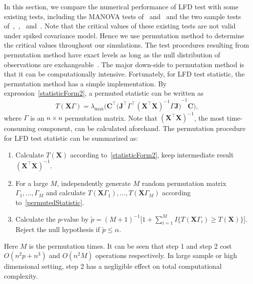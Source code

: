 \documentclass[12pt]{article} %
\newcommand{\bX}{\mathbf{X}}
\newcommand{\bJ}{\mathbf{J}}
\newcommand{\bC}{\mathbf{C}}
\theoremstyle{definition}
\begin{document}
In this section, we compare the numerical performance of LFD test with some existing tests, including the MANOVA tests of~\citet{Schott2007Some} and~\citet{Cai2014High} and the two sample tests of~\cite{Srivastava2007Multivariate},~\cite{Chen2010A},~\cite{Tony2013} and~\cite{Feng2014Two}.
 Note that the critical values of these existing tests are not valid under spiked covariance model.
Hence we use permutation method to determine the critical values throughout our simulations.
   The test procedures resulting from permutation method have exact levels as long as the null distribution of observations are exchangeable~\citep{Romano1990On}.
   The major down-side to permutation method is that it can be computationally intensive.
   Fortunately, for LFD test statistic,  the permutation method has a simple implementation.
    By expression~\eqref{statisticForm2}, a permuted statistic can be written as
    \begin{equation}\label{permutedStatistic}
        T(\bX\Gamma)=\lambda_{\max}\Big(\bC^\top{\big( \bJ^\top \Gamma^\top {(\bX^\top \bX)}^{-1} \Gamma \bJ \big)}^{-1}  \bC\Big),
    \end{equation}
where $\Gamma$ is an $n\times n$ permutation matrix.
   Note that ${(\bX^\top \bX)}^{-1}$, the most time-consuming component, can be calculated aforehand.
   The permutation procedure for LFD test statistic can be summarized as:
   \begin{enumerate}
       \item
           Calculate $T(\bX)$ according to~\eqref{statisticForm2}, keep intermediate result ${(\bX^\top \bX)}^{-1}$.
       \item For a large $M$, independently generate $M$ random permutation matrix $\Gamma_1,\ldots,\Gamma_M$ and calculate $T(\bX\Gamma_1),\ldots,T(\bX\Gamma_M)$ according to~\eqref{permutedStatistic}. 
       \item Calculate the $p$-value by
           $
           \tilde{p}={(M+1)}^{-1}\big[1+\sum_{i=1}^M I\{T(\bX\Gamma_i)\geq T(\bX)\}\big]
           $.
           Reject the null hypothesis if $\tilde{p}\leq \alpha$.
   \end{enumerate}

Here $M$ is the permutation times. 
   It can be seen that  step 1 and step 2 cost $O(n^2 p +n^3)$ and $O(n^2 M)$ operations respectively.
   In large sample or high dimensional setting, step 2 has a negligible effect on total computational complexity.
\end{document}
